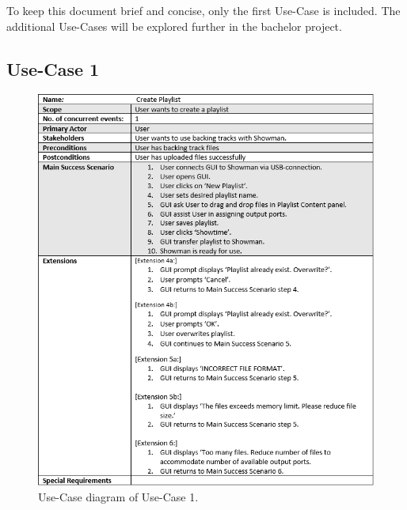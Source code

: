 To keep this document brief and concise, only the first Use-Case is included. The additional Use-Cases will be explored further in the bachelor project.


\subsection{Use-Case 1}

\begin{figure}[H]
\centering
\includegraphics[scale=1]{./pictures/UC1.png}
\caption{Use-Case diagram of Use-Case 1.}
\label{fig:UC1.png}
\end{figure}





